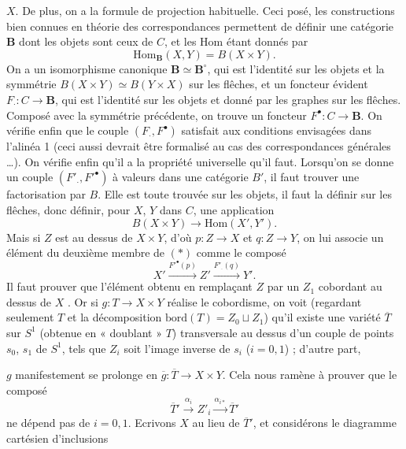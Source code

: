 \documentclass[11pt,a4paper]{article}
\begin{document}

$X$. De plus, on a la formule  de projection
habituelle. Ceci posé, les constructions bien connues en théorie des
correspondances permettent de définir une catégorie $\mathbf{B}$ dont les objets
sont ceux de $C$, et les Hom étant donnés par
\[
\mathrm{Hom}_{\mathbf{B}}(X, Y) = B(X \times Y) .
\]
On a un isomorphisme canonique $\mathbf{B} \simeq \mathbf{B}^{\circ}$, qui est
l'identité sur les objets et la symmétrie $B(X \times Y) \simeq B(Y \times X)$
sur les flêches, et un foncteur évident $F_{\cdot} : C \to \mathbf{B}$, qui est
l'identité sur les objets et donné par les graphes sur les flêches. Composé avec
la symmétrie précédente, on trouve un foncteur $F^{\bullet} : C \to
\mathbf{B}$. On vérifie enfin que le
couple $(F_{\cdot}, F^{\bullet})$ satisfait aux conditions envisagées dans
l'alinéa 1 (ceci aussi devrait être formalisé au cas des correspondances
générales …). On vérifie enfin qu'il a la propriété universelle qu'il faut.
Lorsqu'on se donne un couple $(F'_{\cdot}, F'^{\bullet})$ à valeurs dans une
catégorie $B'$, il faut trouver une factorisation par $B$. Elle est toute
trouvée sur les objets, il faut la définir sur les flêches, donc définir, pour
$X$, $Y$ dans $C$, une application
\[
B(X \times Y) \longrightarrow \mathrm{Hom}(X', Y') . \tag{$*$}
\]
Mais si $Z$ est au dessus de $X \times Y$, d'où $p : Z \to X$ et $q : Z \to Y$,
on lui associe un élément du deuxième membre de $(*)$ comme le composé
\[
X' \xrightarrow{F'^{\bullet}(p)} Z' \xrightarrow{F'_{\cdot}(q)} Y' .
\]
Il faut prouver que l'élément obtenu en remplaçant $Z$  par un
$Z_{1}$ cobordant au dessus de $X$ . Or si $g : T \to X \times
Y$ réalise le cobordisme, on voit (regardant seulement $T$ et la décomposition
$\mathrm{bord}(T) = Z_{0} \sqcup Z_{1}$) qu'il existe une variété
$\overline{T}$ sur $S^{1}$ (obtenue en « doublant » $T$) transversale au dessus
d'un couple de points $s_{0}$, $s_{1}$ de $S^{1}$, tels que $Z_{i}$ soit l'image
inverse  de $s_{i}$ ($i = 0, 1$) ; d'autre part,


$g$ manifestement se prolonge en $\overline{g} : \overline{T} \to X \times Y$.
Cela nous ramène à prouver que le composé
\[
\overline{T}' \xrightarrow{\alpha_{i}} Z'_{i} \xrightarrow{\alpha_{i*}}
\overline{T}'
\]
ne dépend pas de $i = 0, 1$. Ecrivons $X$ au lieu de $\overline{T}'$, et considérons le
diagramme cartésien d'inclusions
\end{document}
